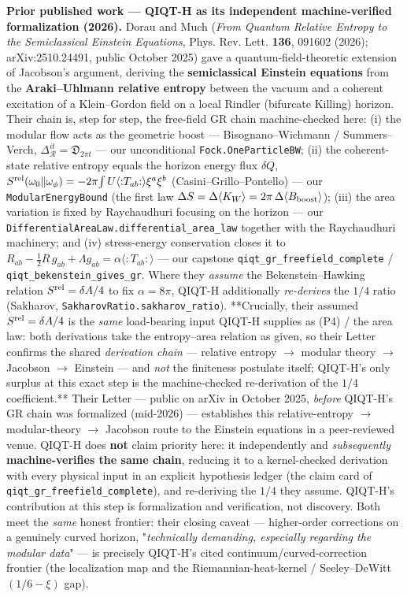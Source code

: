 \documentclass[11pt,a4paper]{article}
\begin{document}
\textbf{Prior published work — QIQT-H as its independent machine-verified formalization (2026).} Dorau and Much (\emph{From Quantum Relative Entropy to the Semiclassical Einstein Equations}, Phys. Rev. Lett. \textbf{136}, 091602 (2026); arXiv:2510.24491, public October 2025) gave a quantum-field-theoretic extension of Jacobson's argument, deriving the \textbf{semiclassical Einstein equations} from the \textbf{Araki–Uhlmann relative entropy} between the vacuum and a coherent excitation of a Klein–Gordon field on a local Rindler (bifurcate Killing) horizon. Their chain is, step for step, the free-field GR chain machine-checked here: (i) the modular flow acts as the geometric boost — Bisognano–Wichmann / Summers–Verch, $\Delta_\mathcal{R}^{it}=\mathfrak{D}_{2\pi t}$ — our unconditional \texttt{Fock.OneParticleBW}; (ii) the coherent-state relative entropy equals the horizon energy flux $\delta Q$, $S^{\rm rel}(\omega_0\|\omega_\phi)=-2\pi\!\int U\langle{:}T_{ab}{:}\rangle\xi^a\xi^b$ (Casini–Grillo–Pontello) — our \texttt{ModularEnergyBound} (the first law $\Delta S=\Delta\langle K_W\rangle=2\pi\,\Delta\langle B_{\rm boost}\rangle$); (iii) the area variation is fixed by Raychaudhuri focusing on the horizon — our \texttt{DifferentialAreaLaw.differential\_area\_law} together with the Raychaudhuri machinery; and (iv) stress-energy conservation closes it to $R_{ab}-\tfrac12 R\,g_{ab}+\Lambda g_{ab}=\alpha\langle{:}T_{ab}{:}\rangle$ — our capstone \texttt{qiqt\_gr\_freefield\_complete} / \texttt{qiqt\_bekenstein\_gives\_gr}. Where they \emph{assume} the Bekenstein–Hawking relation $S^{\rm rel}=\delta A/4$ to fix $\alpha=8\pi$, QIQT-H additionally \emph{re-derives} the $1/4$ ratio (Sakharov, \texttt{SakharovRatio.sakharov\_ratio}). **Crucially, their assumed $S^{\rm rel}=\delta A/4$ is the \emph{same} load-bearing input QIQT-H supplies as (P4) / the area law: both derivations take the entropy–area relation as given, so their Letter confirms the shared \emph{derivation chain} — relative entropy $\to$ modular theory $\to$ Jacobson $\to$ Einstein — and \emph{not} the finiteness postulate itself; QIQT-H's only surplus at this exact step is the machine-checked re-derivation of the $1/4$ coefficient.** Their Letter — public on arXiv in October 2025, \emph{before} QIQT-H's GR chain was formalized (mid-2026) — establishes this relative-entropy $\to$ modular-theory $\to$ Jacobson route to the Einstein equations in a peer-reviewed venue. QIQT-H does \textbf{not} claim priority here: it independently and \emph{subsequently} \textbf{machine-verifies the same chain}, reducing it to a kernel-checked derivation with every physical input in an explicit hypothesis ledger (the claim card of \texttt{qiqt\_gr\_freefield\_complete}), and re-deriving the $1/4$ they assume. QIQT-H's contribution at this step is formalization and verification, not discovery. Both meet the \emph{same} honest frontier: their closing caveat — higher-order corrections on a genuinely curved horizon, "\emph{technically demanding, especially regarding the modular data}" — is precisely QIQT-H's cited continuum/curved-correction frontier (the localization map and the Riemannian-heat-kernel / Seeley–DeWitt $(1/6-\xi)$ gap).
\end{document}
